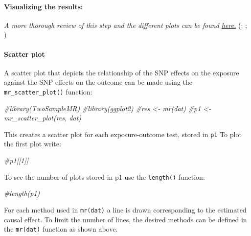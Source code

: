 \documentclass[
]{article}
\newenvironment{Shaded}{\begin{snugshade}}{\end{snugshade}}
\newcommand{\CommentTok}[1]{\textcolor[rgb]{0.56,0.35,0.01}{\textit{#1}}}
\begin{document}
\paragraph{\texorpdfstring{\textbf{Visualizing the
results:}}{Visualizing the results:}}\label{visualizing-the-results}

\emph{A more thorough review of this step and the different plots can be
found
\href{https://mrcieu.github.io/TwoSampleMR/articles/perform_mr.html}{here.}}
(;
;
)

\paragraph{Scatter plot}\label{scatter-plot}

A scatter plot that depicts the relationship of the SNP effects on the
exposure against the SNP effects on the outcome can be made using the
\texttt{mr\_scatter\_plot()} function:

\begin{Shaded}
\begin{Highlighting}[]
\CommentTok{\#library(TwoSampleMR)}
\CommentTok{\#library(ggplot2)}
\CommentTok{\#res \textless{}{-} mr(dat)}
\CommentTok{\#p1 \textless{}{-} mr\_scatter\_plot(res, dat)}
\end{Highlighting}
\end{Shaded}

This creates a scatter plot for each exposure-outcome test, stored in
\texttt{p1} To plot the first plot write:

\begin{Shaded}
\begin{Highlighting}[]
\CommentTok{\#p1[[1]]}
\end{Highlighting}
\end{Shaded}

To see the number of plots stored in p1 use the \texttt{length()}
function:

\begin{Shaded}
\begin{Highlighting}[]
\CommentTok{\#length(p1)}
\end{Highlighting}
\end{Shaded}

For each method used in \texttt{mr(dat)} a line is drawn corresponding
to the estimated causal effect. To limit the number of lines, the
desired methods can be defined in the \texttt{mr(dat)} function as shown
above.
\end{document}
